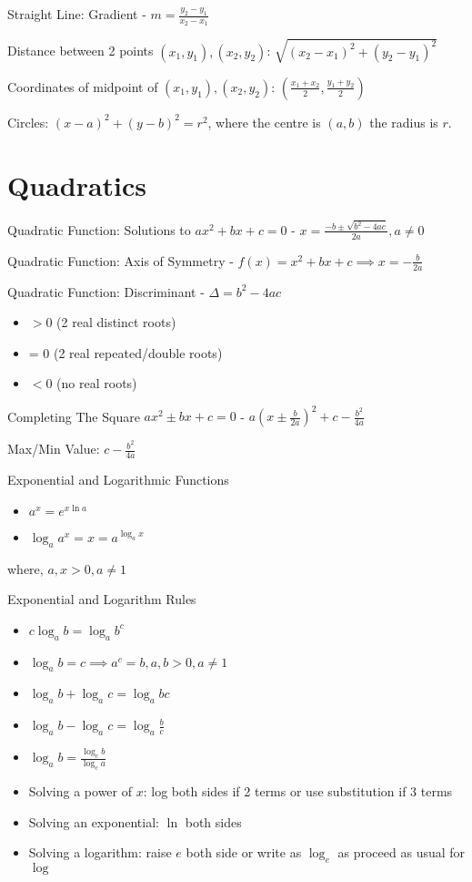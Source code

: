 \documentclass[10pt,a4paper,oneside]{book}
\begin{document}
Straight Line: Gradient - $m=\frac{y_2-y_1}{x_2-x_1}$

Distance between 2 points $(x_1,y_1),(x_2,y_2)$: $\sqrt{(x_2-x_1)^2+(y_2-y_1)^2}$

Coordinates of midpoint of $(x_1,y_1),(x_2,y_2)$: $\left(\frac{x_1+x_2}{2},\frac{y_1+y_2}{2}\right)$

Circles: $(x-a)^2+(y-b)^2=r^2$, where the centre is $(a,b)$ the radius is $r$.

\section*{Quadratics}
Quadratic Function: Solutions to $ax^2+bx+c=0$ - $x=\frac{-b\pm \sqrt{b^2-4ac}}{2a}, a\neq 0$

Quadratic Function: Axis of Symmetry - $f(x)=x^2+bx+c \implies x=-\frac{b}{2a}$

Quadratic Function: Discriminant - $\Delta = b^2-4ac$
\begin{itemize}
    \item $>0$ (2 real distinct roots)
    \item = 0 (2 real repeated/double roots)
    \item $<0$ (no real roots)
\end{itemize}

Completing The Square $ax^2\pm bx+c=0$ - $a\left(x\pm\frac{b}{2a}\right)^2+c-\frac{b^2}{4a}$

Max/Min Value: $c-\frac{b^2}{4a}$

Exponential and Logarithmic Functions
\begin{itemize}
    \item $a^x=e^{x\ln a}$
    \item $\log_a a^x = x = a^{\log_a x}$
\end{itemize}
where, $a,x>0, a\neq 1$

Exponential and Logarithm Rules 
\begin{itemize}
    \item $c\log_a b = \log_a b^c$
    \item $\log_a b = c \implies a^c=b, a,b>0, a\neq 1$
    \item $\log_a b + \log_a c = \log_a bc$
    \item $\log_a b - \log_a c = \log_a \frac{b}{c}$
    \item $\log_a b = \frac{\log_c b}{\log_c a}$
    \item Solving a power of $x$: log both sides if 2 terms or use substitution if 3 terms 
    \item Solving an exponential: $\ln$ both sides 
    \item Solving a logarithm: raise $e$ both side or write as $\log_e$ as proceed as usual for $\log$
\end{itemize}
\end{document}
